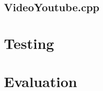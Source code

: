 \documentclass{article}
\newcommand\mylstcaption{}
\begin{document}
\renewcommand\mylstcaption{Contents of ExternalProcess.hpp}
\begin{mdlisting}
    
\end{mdlisting}

\subsection{VideoYoutube.cpp}

\renewcommand\mylstcaption{Contents of VideoYoutube.cpp}
\begin{mdlisting}
    
\end{mdlisting}

\renewcommand\mylstcaption{Contents of VideoYoutube.hpp}
\begin{mdlisting}
    
\end{mdlisting}

\section{Testing}

\section{Evaluation}
\end{document}
